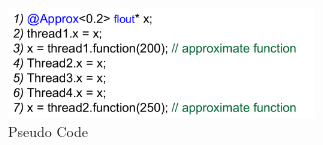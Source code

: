 \begin{figure}[h]
  \centering
  \includegraphics[height=1.2 in, width=3.2in]{figures/figure3.pdf}
  \caption{Pseudo Code}
  \label{fig:profile}
\end{figure}
